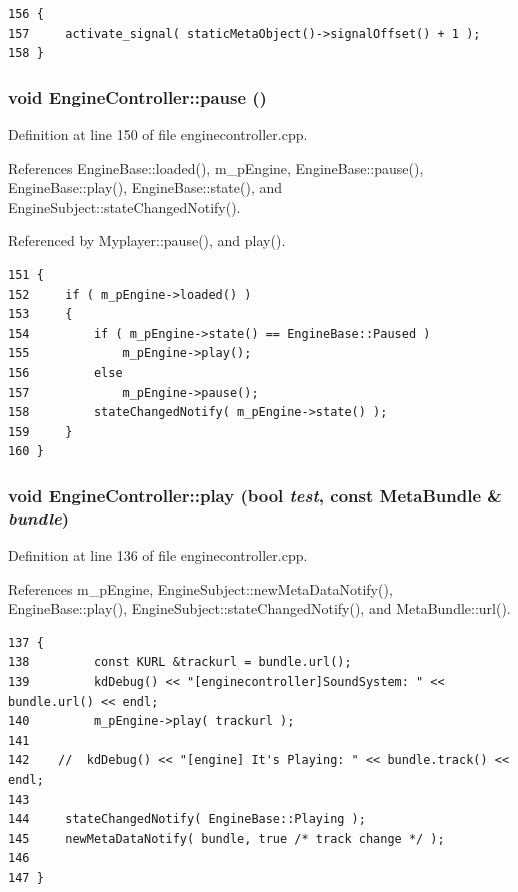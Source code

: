 \footnotesize\begin{verbatim}156 {
157     activate_signal( staticMetaObject()->signalOffset() + 1 );
158 }
\end{verbatim}\normalsize 
{}
\subsubsection{\setlength{\rightskip}{0pt plus 5cm}void Engine\-Controller::pause ()\hspace{0.3cm}{\tt  [slot]}}\label{classEngineController_EngineControlleri4}




Definition at line 150 of file enginecontroller.cpp.

References Engine\-Base::loaded(), m\_\-p\-Engine, Engine\-Base::pause(), Engine\-Base::play(), Engine\-Base::state(), and Engine\-Subject::state\-Changed\-Notify().

Referenced by Myplayer::pause(), and play().



\footnotesize\begin{verbatim}151 {
152     if ( m_pEngine->loaded() )
153     {
154         if ( m_pEngine->state() == EngineBase::Paused )
155             m_pEngine->play();
156         else
157             m_pEngine->pause();
158         stateChangedNotify( m_pEngine->state() );
159     }
160 }
\end{verbatim}\normalsize 
{}
\subsubsection{\setlength{\rightskip}{0pt plus 5cm}void Engine\-Controller::play (bool {\em test}, const {\bf Meta\-Bundle} \& {\em bundle})\hspace{0.3cm}{\tt  [slot]}}\label{classEngineController_EngineControlleri3}




Definition at line 136 of file enginecontroller.cpp.

References m\_\-p\-Engine, Engine\-Subject::new\-Meta\-Data\-Notify(), Engine\-Base::play(), Engine\-Subject::state\-Changed\-Notify(), and Meta\-Bundle::url().



\footnotesize\begin{verbatim}137 {
138         const KURL &trackurl = bundle.url();    
139         kdDebug() << "[enginecontroller]SoundSystem: " << bundle.url() << endl;
140         m_pEngine->play( trackurl );    
141 
142    //  kdDebug() << "[engine] It's Playing: " << bundle.track() << endl;
143 
144     stateChangedNotify( EngineBase::Playing );
145     newMetaDataNotify( bundle, true /* track change */ );
146       
147 }
\end{verbatim}\normalsize 
{}
